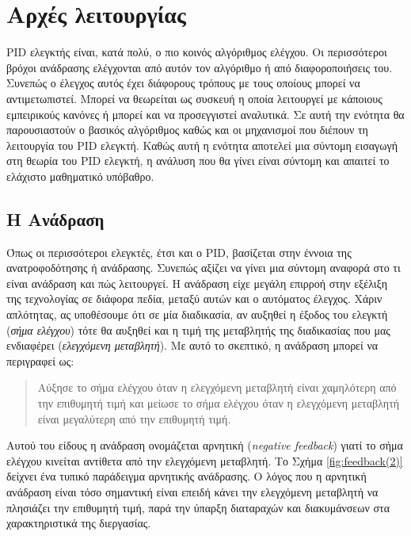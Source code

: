\section{Αρχές λειτουργίας}

\lettrine[findent=2pt]{}{} PID ελεγκτής είναι, κατά πολύ, ο πιο κοινός αλγόριθμος ελέγχου. Οι περισσότεροι βρόχοι ανάδρασης ελέγχονται από αυτόν τον αλγόριθμο ή από διαφοροποιήσεις του. Συνεπώς ο έλεγχος αυτός έχει διάφορους τρόπους με τους οποίους μπορεί να αντιμετωπιστεί. Μπορεί να θεωρείται ως συσκευή η οποία λειτουργεί με κάποιους εμπειρικούς κανόνες ή μπορεί και να προσεγγιστεί αναλυτικά. Σε αυτή την ενότητα θα παρουσιαστούν ο βασικός αλγόριθμος καθώς και οι μηχανισμοί που διέπουν τη λειτουργία του PID ελεγκτή. Καθώς αυτή η ενότητα αποτελεί μια σύντομη εισαγωγή στη θεωρία του PID ελεγκτή, η ανάλυση που θα γίνει είναι σύντομη και απαιτεί το ελάχιστο μαθηματικό υπόβαθρο. 

\subsection{H Ανάδραση}

Όπως οι περισσότεροι ελεγκτές, έτσι και ο PID, βασίζεται στην έννοια της ανατροφοδότησης ή ανάδρασης. Συνεπώς αξίζει να γίνει μια σύντομη αναφορά στο τι είναι ανάδραση και πώς λειτουργεί. Η ανάδραση είχε μεγάλη επιρροή στην εξέλιξη της τεχνολογίας σε διάφορα πεδία, μεταξύ αυτών και ο αυτόματος έλεγχος. Χάριν απλότητας, ας υποθέσουμε ότι σε μία διαδικασία, αν αυξηθεί η έξοδος του ελεγκτή (\emph{σήμα ελέγχου}) τότε θα αυξηθεί και η τιμή της μεταβλητής της διαδικασίας που μας ενδιαφέρει (\emph{ελεγχόμενη μεταβλητή}). Με αυτό το σκεπτικό, η ανάδραση μπορεί να περιγραφεί ως:
\begin{quote}
Αύξησε το σήμα ελέγχου όταν η ελεγχόμενη μεταβλητή είναι χαμηλότερη από την επιθυμητή τιμή και μείωσε το σήμα ελέγχου όταν η ελεγχόμενη μεταβλητή είναι μεγαλύτερη από την επιθυμητή τιμή.
\end{quote}
Αυτού του είδους η ανάδραση ονομάζεται αρνητική (\emph{negative feedback}) γιατί το σήμα ελέγχου κινείται αντίθετα από την ελεγχόμενη μεταβλητή. Το Σχήμα \ref{fig:feedback(2)} δείχνει ένα τυπικό παράδειγμα αρνητικής ανάδρασης. Ο λόγος που η αρνητική ανάδραση είναι τόσο σημαντική είναι επειδή κάνει την ελεγχόμενη μεταβλητή να πλησιάζει την επιθυμητή τιμή, παρά την ύπαρξη διαταραχών και διακυμάνσεων στα χαρακτηριστικά της διεργασίας.

